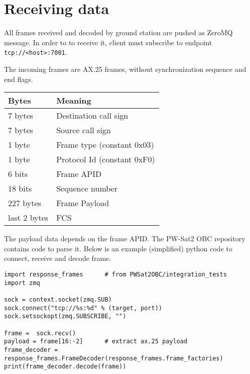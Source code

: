 \section{Receiving data}

All frames received and decoded by ground station are pushed as ZeroMQ message. In order to to receive it, client must subscribe to endpoint \texttt{tcp://<host>:7001}. 

The incoming frames are AX.25 frames, without synchronization sequence and end flags.

\begin{longtable}{l|l}
    \toprule
    \textbf{Bytes} & \textbf{Meaning} \\
    \midrule
    \endhead
    7 bytes & Destination call sign \\
    7 bytes & Source call sign \\
    1 byte & Frame type (constant 0x03) \\ 
    1 byte & Protocol Id (constant 0xF0) \\
    6 bits & Frame APID \\
    18 bits & Sequence number \\
    227 bytes & Frame Payload \\
    last 2 bytes & FCS \\
    \bottomrule
\end{longtable}

The payload data depends on the frame APID. The PW-Sat2 OBC repository contains code to parse it.
Below is an example (simplified) python code to connect, receive and decode frame. 

\begin{verbatim}
import response_frames      # from PWSat2OBC/integration_tests
import zmq

sock = context.socket(zmq.SUB)
sock.connect("tcp://%s:%d" % (target, port))
sock.setsockopt(zmq.SUBSCRIBE, "")

frame =  sock.recv()
payload = frame[16:-2]      # extract ax.25 payload
frame_decoder = response_frames.FrameDecoder(response_frames.frame_factories)
print(frame_decoder.decode(frame))
\end{verbatim}